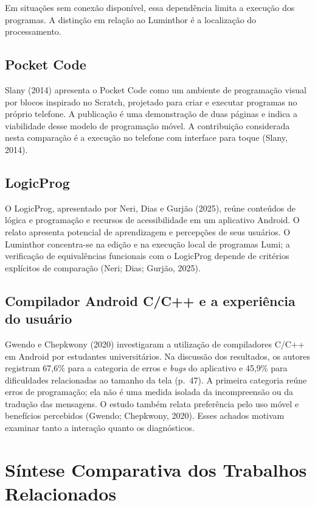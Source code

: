 \documentclass[
    12pt
    ,oneside
    ,a4paper
    ,chapter=TITLE
    ,section=TITLE
    ,sumario=abnt-6027-2012]{abntex2}
\newcommand{\citeNeri}{(Neri; Dias; Gurjão, 2025)}
\newcommand{\citeGwendo}{(Gwendo; Chepkwony, 2020)}
\newcommand{\citeSlany}{(Slany, 2014)}
\newcommand{\textNeri}{Neri, Dias e Gurjão (2025)\xspace}
\newcommand{\textGwendo}{Gwendo e Chepkwony (2020)\xspace}
\newcommand{\textSlany}{Slany (2014)\xspace}
\begin{document}
Em situações sem conexão disponível, essa dependência limita a execução dos
programas. A distinção em relação ao Luminthor é a localização do processamento.

\subsection{Pocket Code}

\textSlany apresenta o Pocket Code como um ambiente de programação visual por
blocos inspirado no Scratch, projetado para criar e executar programas no próprio
telefone. A publicação é uma demonstração de duas páginas e indica a viabilidade desse modelo de programação móvel. A contribuição considerada nesta comparação é a
execução no telefone com interface para toque \citeSlany.

\subsection{LogicProg}

O LogicProg, apresentado por \textNeri, reúne conteúdos de lógica e programação
e recursos de acessibilidade em um aplicativo Android. O relato apresenta potencial de aprendizagem e percepções de seus usuários. O Luminthor
concentra-se na edição e na execução local de programas Lumi; a verificação de
equivalências funcionais com o LogicProg depende de critérios explícitos de
comparação \citeNeri.
\subsection{Compilador Android C/C++ e a experiência do usuário}

\textGwendo investigaram a utilização de compiladores C/C++ em Android por
estudantes universitários. Na discussão dos resultados, os autores registram
67,6\% para a categoria de erros e \textit{bugs} do aplicativo e 45,9\% para
dificuldades relacionadas ao tamanho da tela (p.~47). A primeira categoria reúne
erros de programação; ela não é uma medida isolada da incompreensão ou da tradução
das mensagens.
O estudo também relata preferência pelo uso móvel e benefícios percebidos
\citeGwendo. Esses achados motivam examinar tanto a interação quanto os diagnósticos.

\section{Síntese Comparativa dos Trabalhos Relacionados}
\label{sec:comparacao_ferramentas}
\end{document}
